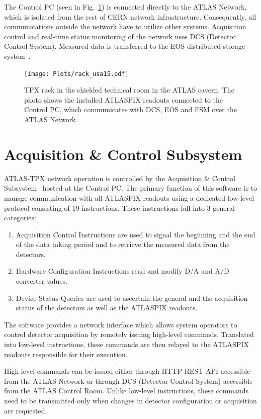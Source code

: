 \documentclass[journal]{IEEEtran}
\begin{document}
The Control PC (seen in Fig.~\ref{fig:rack}) is connected directly to the ATLAS Network, which is isolated from the rest of CERN network infrastructure. Consequently, all communications outside the network have to utilize other systems. Acquisition control and real-time status monitoring of the network uses DCS (Detector Control System). Measured data is transferred to the EOS distributed storage system~\cite{MAscetti2015,Peters2011}.

\begin{figure}[tbp]
	\centering
        \texttt{[image: Plots/rack\_usa15.pdf]}
      \caption {TPX rack in the shielded technical room in the ATLAS cavern. The photo shows the installed ATLASPIX readouts connected to the Control PC, which communicates with DCS, EOS and FSM over the ATLAS Network.}
    \label{fig:rack}
\end{figure}

\section{\label{sec:acquisition}Acquisition \& Control Subsystem}
ATLAS-TPX network operation is controlled by the Acquisition \& Control Subsystem~\cite{Begera2016} hosted at the Control PC. The primary function of this software is to manage communication with all ATLASPIX readouts using a dedicated low-level protocol consisting of 19 instructions. These instructions fall into 3 general categories:
~
\begin{enumerate}
  \item Acquisition Control Instructions are used to signal the beginning and the end of the data taking period and to retrieve the measured data from the detectors.
  \item Hardware Configuration Instructions read and modify D/A and A/D converter values.
  \item Device Status Queries are used to ascertain the general and the acquisition status of the detectors as well as the ATLASPIX readouts.
\end{enumerate}

The software provides a network interface which allows system operators to control detector acquisition by remotely issuing high-level commands. Translated into low-level instructions, these commands are then relayed to the ATLASPIX readouts responsible for their execution.

High-level commands can be issued either through HTTP REST API accessible from the ATLAS Network or through DCS (Detector Control System) accessible from the ATLAS Control Room. Unlike low-level instructions, these commands need to be transmitted only when changes in detector configuration or acquisition are requested.
\end{document}
